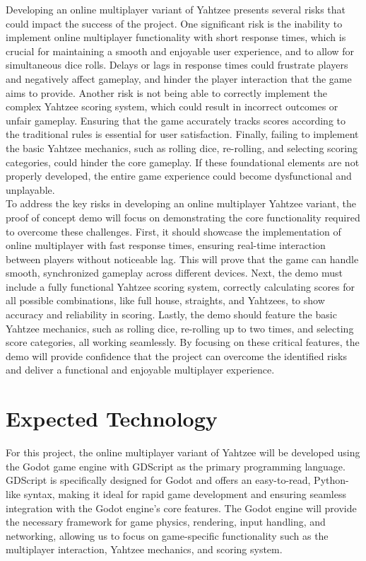 \documentclass{article}
\begin{document}
Developing an online multiplayer variant of Yahtzee presents several risks that could impact the success of the project. One significant risk is the inability to implement online multiplayer functionality with short response times, which is crucial for maintaining a smooth and enjoyable user experience, and to allow for simultaneous dice rolls. Delays or lags in response times could frustrate players and negatively affect gameplay, and hinder the player interaction that the game aims to provide. Another risk is not being able to correctly implement the complex Yahtzee scoring system, which could result in incorrect outcomes or unfair gameplay. Ensuring that the game accurately tracks scores according to the traditional rules is essential for user satisfaction. Finally, failing to implement the basic Yahtzee mechanics, such as rolling dice, re-rolling, and selecting scoring categories, could hinder the core gameplay. If these foundational elements are not properly developed, the entire game experience could become dysfunctional and unplayable. \\

To address the key risks in developing an online multiplayer Yahtzee variant, the proof of concept demo will focus on demonstrating the core functionality required to overcome these challenges. First, it should showcase the implementation of online multiplayer with fast response times, ensuring real-time interaction between players without noticeable lag. This will prove that the game can handle smooth, synchronized gameplay across different devices. Next, the demo must include a fully functional Yahtzee scoring system, correctly calculating scores for all possible combinations, like full house, straights, and Yahtzees, to show accuracy and reliability in scoring. Lastly, the demo should feature the basic Yahtzee mechanics, such as rolling dice, re-rolling up to two times, and selecting score categories, all working seamlessly. By focusing on these critical features, the demo will provide confidence that the project can overcome the identified risks and deliver a functional and enjoyable multiplayer experience.\\

\section{Expected Technology}

For this project, the online multiplayer variant of Yahtzee will be developed using the Godot game engine with GDScript as the primary programming language. GDScript is specifically designed for Godot and offers an easy-to-read, Python-like syntax, making it ideal for rapid game development and ensuring seamless integration with the Godot engine's core features. The Godot engine will provide the necessary framework for game physics, rendering, input handling, and networking, allowing us to focus on game-specific functionality such as the multiplayer interaction, Yahtzee mechanics, and scoring system. \\
\end{document}
